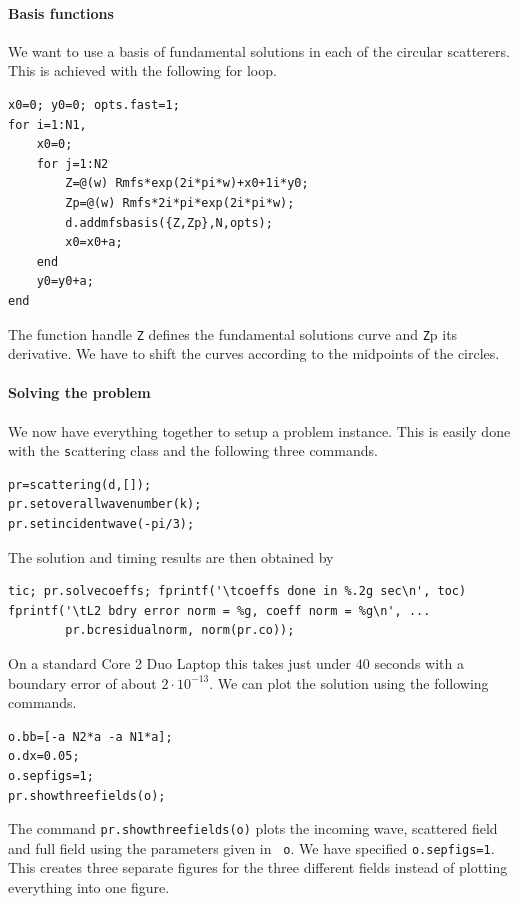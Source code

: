 \paragraph{Basis functions}

We want to use a basis of fundamental solutions in each of the
circular scatterers. This is achieved with the following for loop.
\begin{verbatim}
x0=0; y0=0; opts.fast=1;
for i=1:N1,
    x0=0;
    for j=1:N2
        Z=@(w) Rmfs*exp(2i*pi*w)+x0+1i*y0;
        Zp=@(w) Rmfs*2i*pi*exp(2i*pi*w);
        d.addmfsbasis({Z,Zp},N,opts);
        x0=x0+a;
    end
    y0=y0+a;
end
\end{verbatim}
The function handle {\texttt Z} defines the fundamental solutions
curve and {\texttt Zp} its derivative. We have to shift the curves
according to the midpoints of the circles.

\paragraph{Solving the problem}
We now have everything together to setup a problem instance.
This is easily done with the {\texttt
  scattering} class and the following three commands.

\begin{verbatim}
pr=scattering(d,[]);
pr.setoverallwavenumber(k);
pr.setincidentwave(-pi/3);
\end{verbatim}

The solution and timing results are then obtained by
\begin{verbatim}
tic; pr.solvecoeffs; fprintf('\tcoeffs done in %.2g sec\n', toc)
fprintf('\tL2 bdry error norm = %g, coeff norm = %g\n', ...
        pr.bcresidualnorm, norm(pr.co));
\end{verbatim}
On a standard Core 2 Duo Laptop this takes just under $40$
seconds with a boundary error of about $2\cdot 10^{-13}$.
We can plot the solution using the following commands.
\begin{verbatim}
o.bb=[-a N2*a -a N1*a];
o.dx=0.05;
o.sepfigs=1;
pr.showthreefields(o);
\end{verbatim}
The command {\tt pr.showthreefields(o)} plots the incoming wave,
scattered field and full field using the parameters given in {\tt
  o}. We have specified {\tt o.sepfigs=1}. This creates three
separate figures for the three different fields instead of plotting
everything into one figure.

